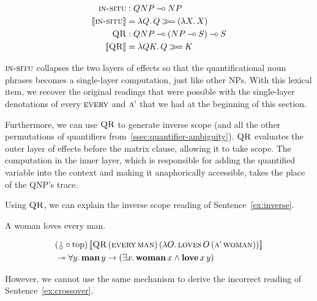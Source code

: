 \begin{align*}
  \textsc{in-situ} &: QNP \mathbin{{-}\mkern-3.5mu{\circ}} NP \\
  \llbracket \textsc{in-situ} \rrbracket &= \lambda Q.\, Q \mathbin{\gg\!=} (\lambda X.\, X) \\
  \textsc{QR} &: QNP \mathbin{{-}\mkern-3.5mu{\circ}} (NP \mathbin{{-}\mkern-3.5mu{\circ}} S) \mathbin{{-}\mkern-3.5mu{\circ}} S \\
  \llbracket \textsc{QR} \rrbracket &= \lambda Q K.\, Q \mathbin{\gg\!=} K
\end{align*}

$\textsc{in-situ}$ collapses the two layers of effects so that the
quantificational noun phrases becomes a single-layer computation, just like
other NPs. With this lexical item, we recover the original readings that
were possible with the single-layer denotations of every $\textsc{every}$ and
$\textsc{a'}$ that we had at the beginning of this section.

Furthermore, we can use $\textsc{QR}$ to generate inverse scope (and all the
other permutations of quantifiers
from~\ref{ssec:quantifier-ambiguity}). $\textsc{QR}$ evaluates the outer layer
of effects before the matrix clause, allowing it to take scope. The
computation in the inner layer, which is responsible for adding the
quantified variable into the context and making it anaphorically
accessible, takes the place of the QNP's trace.

Using $\textsc{QR}$, we can explain the inverse scope reading of
Sentence~\ref{ex:inverse}.

\begin{exe}
  \ex A woman loves every man. \label{ex:inverse}
\end{exe}

\begin{align*}
  &\ap{(\cherry \circ \TOP)}{\sem{\app{\abs{QR}}{(\ap{\abs{every}}{\abs{man}})}{(\lam{O}{\app{\abs{loves}}{O}{(\ap{\abs{a'}}{\abs{woman}})}})}}} \\
  &\tto \forall y.\, \ap{\obj{man}}{y} \to (\exists x.\, \ap{\obj{woman}}{x} \land \app{\obj{love}}{x}{y})
\end{align*}

However, we cannot use the same mechanism to derive the incorrect reading
of Sentence~\ref{ex:crossover}.

